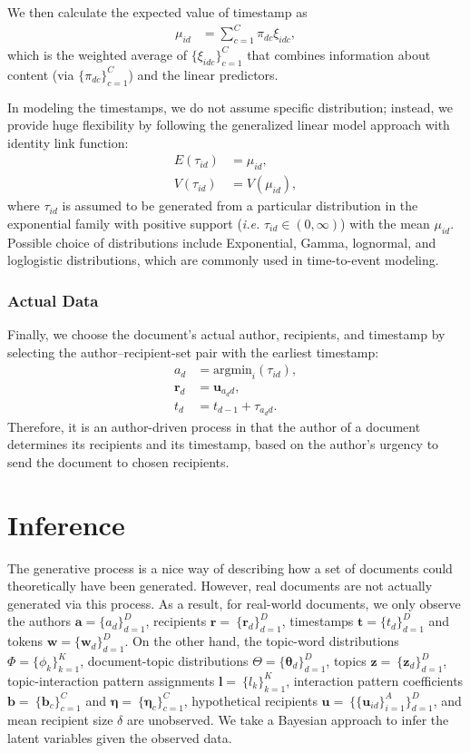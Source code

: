 \documentclass[twoside]{article}
\begin{document}
We then calculate the expected value of timestamp as
\begin{align*}\mu_{id} &= \sum_{c=1}^C \pi_{dc}\xi_{idc},
\end{align*}
which is the weighted average of $\{\xi_{idc}\}_{c=1}^C$ that combines information about content (via $\{\pi_{dc}\}_{c=1}^C$) and the linear predictors.

In modeling the timestamps, we do not assume specific distribution; instead, we provide huge flexibility by following the generalized linear model approach with identity link function:
\begin{align*}
E(\tau_{id}) &= \mu_{id},\\
V(\tau_{id}) &= V(\mu_{id}),
\end{align*}
where $\tau_{id}$ is assumed to be generated from a particular distribution in the exponential family with positive support (\textit{i.e.} $\tau_{id} \in (0, \infty)$) with the mean $\mu_{id}$. Possible choice of distributions include Exponential, Gamma, lognormal, and loglogistic distributions, which are commonly used in time-to-event modeling.
\subsubsection{Actual Data}\label{subsubsec:Actual Data}
Finally, we choose the document's actual author, recipients, and timestamp by selecting the author--recipient-set pair with the earliest timestamp:
\begin{align*}
a_d &= \mbox{argmin}_{i}(\tau_{id}),\\
\boldsymbol{r}_d &= \boldsymbol{u}_{a_d d},\\
t_d &=t_{d-1} + \tau_{a_d d}.
\end{align*}
Therefore, it is an author-driven process in that the author of a document determines its recipients and its timestamp, based on the author's urgency to send the document to chosen recipients. 
\section{Inference}\label{sec:Inference}
The generative process is a nice way of describing how a set of documents could theoretically have been generated. However,
real documents are not actually generated via this process. As a result, for real-world documents, we only observe the authors $\boldsymbol{a}= \{a_d\}_{d=1}^D$, recipients $\boldsymbol{r}=\ \{\boldsymbol{r}_d\}_{d=1}^D$, timestamps $\boldsymbol{t}= \{t_d\}_{d=1}^D$ and tokens $\boldsymbol{w}= \{\boldsymbol{w}_d\}_{d=1}^D$. On the other hand, the topic-word distributions $\Phi =  \{\phi_k\}_{k=1}^K$, document-topic distributions $\Theta = \{\boldsymbol{\theta}_d\}_{d=1}^D$, topics $\boldsymbol{z}=\ \{\boldsymbol{z}_d\}_{d=1}^D$, topic-interaction pattern assignments $\boldsymbol{l}=\ \{l_k\}_{k=1}^K$, interaction pattern coefficients $\boldsymbol{b}=\ \{\boldsymbol{b}_c\}_{c=1}^C$ and $\boldsymbol{\eta}=\ \{\boldsymbol{\eta}_c\}_{c=1}^C$, hypothetical recipients $\boldsymbol{u}=\ \{\{\boldsymbol{u}_{id}\}_{i=1}^A\}_{d=1}^D$, and mean recipient size $\delta$ are unobserved. We take a Bayesian approach to infer the latent variables given the observed data. 
\end{document}
